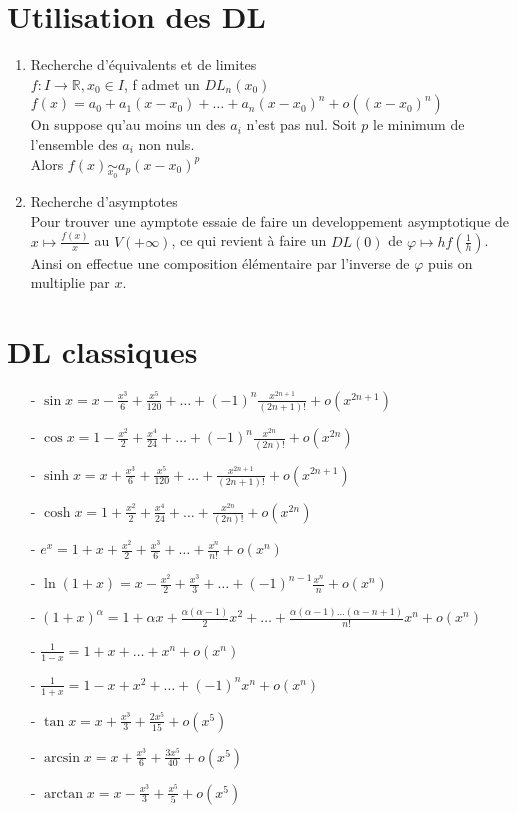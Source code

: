 \documentclass[fleqn]{article}
\theoremstyle{definition} \newtheorem*{defi}{D\'efinition}
\theoremstyle{definition} \newtheorem*{theo}{Th\'eor\`eme}
\theoremstyle{definition} \newtheorem*{prop}{Propri\'et\'e}
\theoremstyle{definition} \newtheorem*{coro}{Corollaire}
\theoremstyle{remark} \newtheorem*{rqs}{Remarques}
\begin{document}
\section{Utilisation des DL}
\begin{enumerate}
	\item Recherche d'\'equivalents et de limites \\
		$f: I \rightarrow \mathbb{R}, x_0 \in I$, f admet un $DL_n(x_0)$ \\
		$f(x) =  a_0 + a_1(x-x_0) + \hdots + a_n(x-x_0)^n + o((x-x_0)^n)$ \\
		On suppose qu'au moins un des $a_i$ n'est pas nul. Soit $p$ le minimum de l'ensemble des $a_i$ non nuls. \\
		Alors $f(x) \underset{x_0}{\sim} a_p(x-x_0)^p$
	\item Recherche d'asymptotes \\
		Pour trouver une aymptote essaie de faire un developpement asymptotique de $x \mapsto \frac{f(x)}{x}$ au $V(+\infty)$, ce qui revient
		\`a faire un $DL(0)$ de $\varphi \mapsto h f(\frac{1}{h})$. \\
		Ainsi on effectue une composition \'el\'ementaire par l'inverse de $\varphi$ puis on multiplie par $x$.
\end{enumerate}

\section{DL classiques}
\begin{itemize}
	\item [-] $\sin x = x - \frac{x^3}{6} + \frac{x^5}{120} + \hdots + (-1)^n \frac{x^{2n+1}}{(2n+1)!} + o(x^{2n+1})$
	\item [-] $\cos x = 1 - \frac{x^2}{2} + \frac{x^4}{24} + \hdots + (-1)^n \frac{x^{2n}}{(2n)!} + o(x^{2n})$
	\item [-] $\sinh x = x + \frac{x^3}{6} + \frac{x^5}{120} + \hdots + \frac{x^{2n+1}}{(2n+1)!} + o(x^{2n+1})$
	\item [-] $\cosh x = 1 + \frac{x^2}{2} + \frac{x^4}{24} + \hdots + \frac{x^{2n}}{(2n)!} + o(x^{2n})$
	\item [-] $e^x = 1 + x + \frac{x^2}{2} + \frac{x^3}{6} + \hdots + \frac{x^n}{n!} + o(x^n)$
	\item [-] $\ln(1+x) = x - \frac{x^2}{2} + \frac{x^3}{3} + \hdots + (-1)^{n-1} \frac{x^n}{n} + o(x^n)$
	\item [-] $(1+x)^{\alpha} = 1 + \alpha x + \frac{\alpha(\alpha -1)}{2} x^2 + \hdots + \frac{\alpha(\alpha-1)\hdots(\alpha-n+1)}{n!} x^n
		+ o(x^n)$
	\item [-] $\frac{1}{1-x} = 1 + x + \hdots + x^n + o(x^n)$
	\item [-] $\frac{1}{1+x} = 1 - x + x^2 + \hdots + (-1)^n x^n + o(x^n)$
	\item [-] $\tan x = x + \frac{x^3}{3} + \frac{2x^5}{15} + o(x^5)$
	\item [-] $\arcsin x = x + \frac{x^3}{6} + \frac{3x^5}{40} + o(x^5)$
	\item [-] $\arctan x = x - \frac{x^3}{3} + \frac{x^5}{5} + o(x^5)$
\end{itemize}
\end{document}
